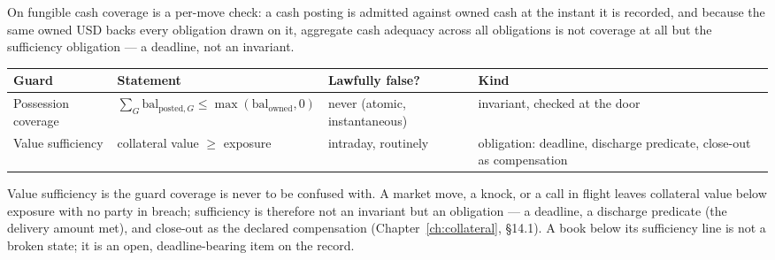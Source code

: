 \documentclass[11pt,a4paper]{article}
\begin{document}
On fungible cash coverage is a per-move check: a cash posting is admitted against owned
cash at the instant it is recorded, and because the same owned USD backs every
obligation drawn on it, aggregate cash adequacy across all obligations is not coverage
at all but the sufficiency obligation --- a deadline, not an invariant.

\begin{center}
\begin{tabular}{@{}p{}p{}p{}p{}@{}}
\toprule
Guard & Statement & Lawfully false? & Kind \\
\midrule
Possession coverage & $\sum_G \mathrm{bal}_{\mathrm{posted},G} \le \max(\mathrm{bal}_{\mathrm{owned}},0)$ & never (atomic, instantaneous) & invariant, checked at the door \\
Value sufficiency & collateral value $\ge$ exposure & intraday, routinely & obligation: deadline, discharge predicate, close-out as compensation \\
\bottomrule
\end{tabular}
\end{center}

\noindent Value sufficiency is the guard coverage is never to be confused with. A
market move, a knock, or a call in flight leaves collateral value below exposure
with no party in breach; sufficiency is therefore not an invariant but an
obligation --- a deadline, a discharge predicate (the delivery amount met), and
close-out as the declared compensation (Chapter~\ref{ch:collateral}, \S 14.1). A
book below its sufficiency line is not a broken state; it is an open,
deadline-bearing item on the record.
\end{document}
